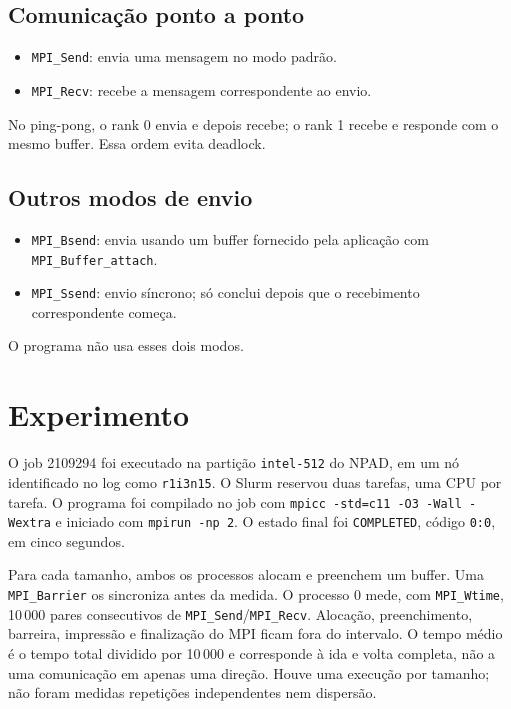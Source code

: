 \documentclass[11pt,letterpaper]{article}
\begin{document}
\subsection{Comunicação ponto a ponto}
\begin{itemize}
\item \texttt{MPI\_Send}: envia uma mensagem no modo padrão.
\item \texttt{MPI\_Recv}: recebe a mensagem correspondente ao envio.
\end{itemize}
No ping-pong, o rank 0 envia e depois recebe; o rank 1 recebe e responde com o mesmo buffer. Essa ordem evita deadlock.

\subsection{Outros modos de envio}
\begin{itemize}
\item \texttt{MPI\_Bsend}: envia usando um buffer fornecido pela aplicação com \texttt{MPI\_Buffer\_attach}.
\item \texttt{MPI\_Ssend}: envio síncrono; só conclui depois que o recebimento correspondente começa.
\end{itemize}
O programa não usa esses dois modos.

\section{Experimento}
O job 2109294 foi executado na partição \texttt{intel-512} do NPAD, em um nó identificado no log como \texttt{r1i3n15}. O Slurm reservou duas tarefas, uma CPU por tarefa. O programa foi compilado no job com \texttt{mpicc -std=c11 -O3 -Wall -Wextra} e iniciado com \texttt{mpirun -np 2}. O estado final foi \texttt{COMPLETED}, código \texttt{0:0}, em cinco segundos.

Para cada tamanho, ambos os processos alocam e preenchem um buffer. Uma \texttt{MPI\_Barrier} os sincroniza antes da medida. O processo 0 mede, com \texttt{MPI\_Wtime}, 10\,000 pares consecutivos de \texttt{MPI\_Send}/\texttt{MPI\_Recv}. Alocação, preenchimento, barreira, impressão e finalização do MPI ficam fora do intervalo. O tempo médio é o tempo total dividido por 10\,000 e corresponde à ida e volta completa, não a uma comunicação em apenas uma direção. Houve uma execução por tamanho; não foram medidas repetições independentes nem dispersão.
\end{document}
